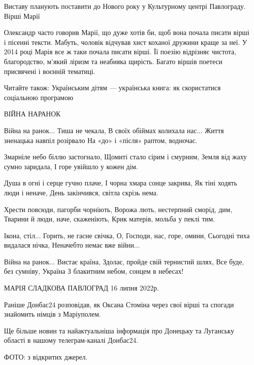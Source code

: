 Виставу планують поставити до Нового року у Культурному центрі Павлограду.
Вірші Марії

Олександр часто говорив Марії, що дуже хотів би, щоб вона почала писати вірші і
пісенні тексти. Мабуть, чоловік відчував хист коханої дружини краще за неї. У
2014 році Марія все ж таки почала писати вірші. Її поезію відрізняє чистота,
благородство, м'який ліризм та неабияка щирість. Багато віршів поетеси
присвячені і воєнній тематиці.

Читайте також: Українським дітям — українська книга: як скористатися соціальною
програмою

ВІЙНА НАРАНОК

Війна на ранок... Тиша не чекала, В своїх обіймах колихала нас... Життя зненацька
навпіл розірвало На «до» і «після» раптом, водночас.

Змарніле небо біллю застогнало, Щомиті стало сірим і смурним, Земля від жаху
сумно заридала, І горе увійшло у кожен дім.

Душа в огні і серце гучно плаче, І чорна хмара сонце закрива, Як тіні ходять
люди і неначе, День закінчився, світла скрізь нема.

Хрести повсюди, пагорби чорніють, Ворожа лють, нестерпний сморід, дим, Тварини
й люди, наче, скаженіють, Крик матерів, мольба у пеклі тим.

Ікона, стіл... Горить, не гасне свічка, О, Господи, нас, горе, омини, Сьогодні
тиха видалася нічка, Неначебто немає вже війни...

Війна на ранок... Вистає країна, Здолає, пройде свій тернистий шлях, Все буде,
без сумніву, Україна З блакитним небом, сонцем в небесах!

МАРІЯ СЛАДКОВА ПАВЛОГРАД 16 липня 2022р.

Раніше Донбас24 розповідав, як Оксана Стоміна через свої вірші та спогади
знайомить німців з Маріуполем.

Ще більше новин та найактуальніша інформація про Донецьку та Луганську області
в нашому телеграм-каналі Донбас24.

ФОТО: з відкритих джерел.
